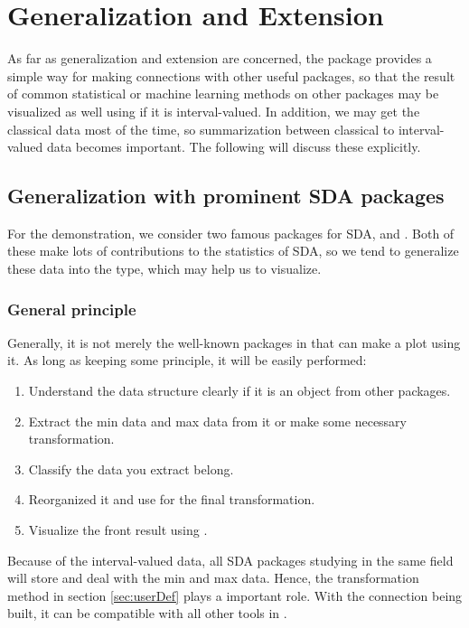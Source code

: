 \documentclass[article]{jss}
\begin{document}
\section{Generalization and Extension}

As far as generalization and extension are concerned, the package provides a simple way for making connections with other useful packages, so that the result of common statistical or machine learning methods on other packages may be visualized as well using  if it is interval-valued. In addition, we may get the classical data most of the time, so summarization between classical to interval-valued data becomes important. The following will discuss these explicitly. 

\subsection{Generalization with prominent SDA packages}

For the demonstration, we consider two famous  packages for SDA,  \cite{irpino2015} and  \cite{Silva2011}. Both of these make lots of contributions to the statistics of SDA, so we tend to generalize these data into the  type, which may help us to visualize.

\subsubsection{General principle}\label{sec:genPrin}

Generally, it is not merely the well-known packages in  that can make a plot using it. As long as keeping some principle, it will be easily performed:

\begin{enumerate}
  \item Understand the data structure clearly if it is an object from other packages.
  \item Extract the min data and max data from it or make some necessary transformation.
  \item Classify the data you extract belong.
  \item Reorganized it and use  for the final transformation.
  \item Visualize the front result using .
\end{enumerate}

Because of the interval-valued data, all SDA packages studying in the same field will store and deal with the min and max data. Hence, the transformation method in section \ref{sec:userDef} plays a important role. With the connection being built, it can be compatible with all other tools in .
\end{document}
